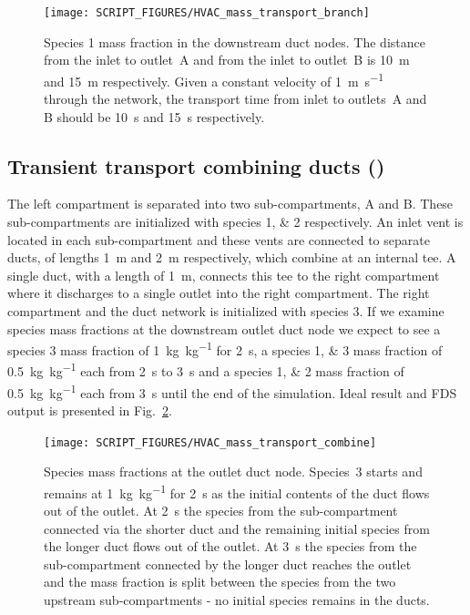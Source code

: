 \documentclass[11pt]{book}
\begin{document}
\begin{figure}[ht]
\centering
\texttt{[image: SCRIPT\_FIGURES/HVAC\_mass\_transport\_branch]}
\caption[ test case]{Species \num{1} mass fraction in the downstream duct nodes. The distance from the inlet to outlet~A and from the inlet to outlet~B is \SI{10}{\meter} and \SI{15}{\meter} respectively. Given a constant velocity of \SI[per-mode=symbol]{1}{\meter\per\second} through the network, the transport time from inlet to outlets~A and B should be \SI{10}{\second} and \SI{15}{\second} respectively.}
\label{fig_HVAC_mass_transport_branch}
\end{figure}

\subsection{Transient transport combining ducts (\texorpdfstring{}{HVAC\_mass\_transport\_combine})}
\label{HVAC_mass_transport_combine}
The left compartment is separated into two sub-compartments, A and B. These sub-compartments are initialized with species \numlist{1;2} respectively. An inlet vent is located in each sub-compartment and these vents are connected to separate ducts, of lengths \SI{1}{\meter} and \SI{2}{\meter} respectively, which combine at an internal tee. A single duct, with a length of \SI{1}{\meter}, connects this tee to the right compartment where it discharges to a single outlet into the right compartment. The right compartment and the duct network is initialized with species \num{3}. If we examine species mass fractions at the downstream outlet duct node we expect to see a species \num{3} mass fraction of \SI[per-mode=symbol]{1}{\kilogram\per\kilogram} for \SI{2}{\second}, a species \numlist{1;3} mass fraction of \SI[per-mode=symbol]{0.5}{\kilogram\per\kilogram} each from \SI{2}{\second} to \SI{3}{\second} and a species \numlist{1;2} mass fraction of \SI[per-mode=symbol]{0.5}{\kilogram\per\kilogram} each from \SI{3}{\second} until the end of the simulation. Ideal result and FDS output is presented in Fig.~\ref{fig_HVAC_mass_transport_combine}.

\begin{figure}[ht]
\centering
\texttt{[image: SCRIPT\_FIGURES/HVAC\_mass\_transport\_combine]}
\caption[ test case]{Species mass fractions at the outlet duct node. Species~3 starts and remains at \SI[per-mode=symbol]{1}{\kilogram\per\kilogram} for \SI{2}{\second} as the initial contents of the duct flows out of the outlet. At \SI{2}{\second} the species from the sub-compartment connected via the shorter duct and the remaining initial species from the longer duct flows out of the outlet. At \SI{3}{\second} the species from the sub-compartment connected by the longer duct reaches the outlet and the mass fraction is split between the species from the two upstream sub-compartments - no initial species remains in the ducts.}
\label{fig_HVAC_mass_transport_combine}
\end{figure}
\end{document}
